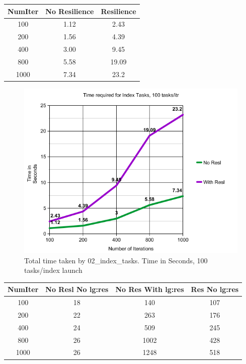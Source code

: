 \begin{center}
 \begin{tabular}{||c | | c | c ||} 
 \hline
 NumIter& No Resilience & Resilience \\ [0.25ex] 
 \hline\hline
100 &  1.12 & 2.43\\ 
 \hline
200 &  1.56 & 4.39\\ 
 \hline
400 &  3.00 & 9.45\\ 
 \hline
800 &  5.58 & 19.09\\ 
 \hline
1000 &  7.34 & 23.2 \\ [1ex] 
 \hline
\end{tabular}
\end{center}

\begin{figure}
\includegraphics[width=\textwidth]{images/index_tasks_time2.png}
\caption{Total time taken by 02\_index\_tasks. Time in Seconds, 100 tasks/index launch }
\end{figure}




\begin{center}
 \begin{tabular}{||c | c | c | c||} 
 \hline
 NumIter& No Resl No lg:res & No Res With lg:res & Res No lg:res \\ [0.25ex] 
 \hline\hline
100 &  18 & 140 & 107 \\ 
 \hline
200 &  22 & 263 & 176 \\ 
 \hline
400 &  24 & 509 & 245 \\ 
 \hline
800 &  26 & 1002 & 428\\ 
 \hline
1000 & 26 & 1248 & 518\\ [1ex] 
 \hline
\end{tabular}
\end{center}

